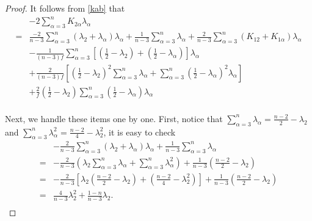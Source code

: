 \documentclass[12pt]{amsart}
\begin{document}
\begin{proof}
It follows from \eqref{kab} that
\begin{equation*}
	\begin{aligned}
		&-2\sum_{\alpha=3}^nK_{2\alpha}\lambda_\alpha\\
		 =&\frac{-2}{n-3}\sum_{\alpha=3}^n(\lambda_{2}+\lambda_{\alpha})\lambda_\alpha+\frac{1}{n-3}\sum_{\alpha=3}^n\lambda_\alpha+\frac{2}{n-3}\sum_{\alpha=3}^n(K_{12}+K_{1\alpha })\lambda_\alpha\\
		&-{\frac{1}{(n-3)f}}\sum_{\alpha=3}^n\left[ ({\frac{1}{2}}-\lambda_{2})+({\frac{1}{2}}-\lambda_{\alpha})\right] \lambda_\alpha\\
		&+\frac{2}{(n-3)f}\left[({\frac{1}{2}}-\lambda_{2})^2\sum_{\alpha=3}^n\lambda_{\alpha}+ \sum_{\alpha=3}^n({\frac{1}{2}}-\lambda_{\alpha})^2 \lambda_{\alpha}\right]\\
		&+\frac{2}{f}({\frac{1}{2}}-\lambda_{2})\sum_{\alpha=3}^n({\frac{1}{2}}-\lambda_{\alpha})\lambda_{\alpha}
		\\
	\end{aligned}
\end{equation*}

Next, we handle these items one by one. First, notice that $\sum_{\alpha=3}^n\lambda_\alpha=\frac{n-2}{2}-\lambda_2$ and $\sum_{\alpha=3}^n\lambda_\alpha^2=\frac{n-2}{4}-\lambda_2^2$, it is easy to check
\begin{equation*}
	\begin{aligned}
		&-\frac{2}{n-3}\sum_{\alpha=3}^n(\lambda_{2}+\lambda_{\alpha})\lambda_\alpha+\frac{1}{n-3}\sum_{\alpha=3}^n\lambda_\alpha\\		 =&-\frac{2}{n-3}(\lambda_{2}\sum_{\alpha=3}^n\lambda_\alpha+\sum_{\alpha=3}^n\lambda_\alpha^2)+\frac{1}{n-3}(\frac{n-2}{2}-\lambda_{2})\\
		 =&-\frac{2}{n-3}\left[\lambda_2\left(\frac{n-2}{2}-\lambda_2\right)+\left(\frac{n-2}{4}-\lambda_2^2\right)\right]+\frac{1}{n-3}\left(\frac{n-2}{2}-\lambda_2\right)\\
		=&\frac{4}{n-3}\lambda_2^2+\frac{1-n}{n-3}\lambda_2.\\
	\end{aligned}
\end{equation*}


\end{proof}
\end{document}
